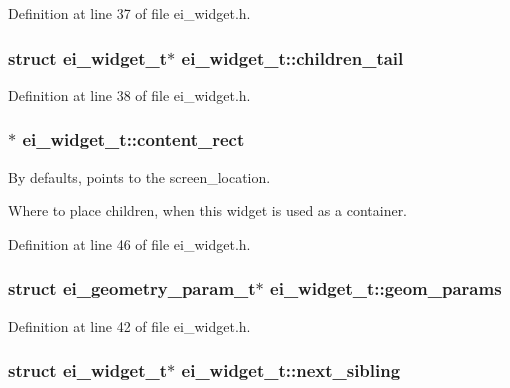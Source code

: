 Definition at line 37 of file ei\-\_\-widget.\-h.

\hypertarget{structei__widget__t_aece2f3059f252538ae787857e7eea2a2}{
\subsubsection[{children\-\_\-tail}]{\setlength{\rightskip}{0pt plus 5cm}struct {\bf ei\-\_\-widget\-\_\-t}$\ast$ ei\-\_\-widget\-\_\-t\-::children\-\_\-tail}}\label{structei__widget__t_aece2f3059f252538ae787857e7eea2a2}


Definition at line 38 of file ei\-\_\-widget.\-h.

\hypertarget{structei__widget__t_a75c29d388a5f5b32cdd8a9c855bc2a75}{
\subsubsection[{content\-\_\-rect}]{$\ast$ ei\-\_\-widget\-\_\-t\-::content\-\_\-rect}}\label{structei__widget__t_a75c29d388a5f5b32cdd8a9c855bc2a75}


By defaults, points to the screen\-\_\-location. 

Where to place children, when this widget is used as a container. 

Definition at line 46 of file ei\-\_\-widget.\-h.

\hypertarget{structei__widget__t_a31885277c641803a931fff1d6256203f}{
\subsubsection[{geom\-\_\-params}]{\setlength{\rightskip}{0pt plus 5cm}struct {\bf ei\-\_\-geometry\-\_\-param\-\_\-t}$\ast$ ei\-\_\-widget\-\_\-t\-::geom\-\_\-params}}\label{structei__widget__t_a31885277c641803a931fff1d6256203f}


Definition at line 42 of file ei\-\_\-widget.\-h.

\hypertarget{structei__widget__t_ada15cedaf8e6e104a1461c1754ff6cb3}{
\subsubsection[{next\-\_\-sibling}]{\setlength{\rightskip}{0pt plus 5cm}struct {\bf ei\-\_\-widget\-\_\-t}$\ast$ ei\-\_\-widget\-\_\-t\-::next\-\_\-sibling}}\label{structei__widget__t_ada15cedaf8e6e104a1461c1754ff6cb3}


